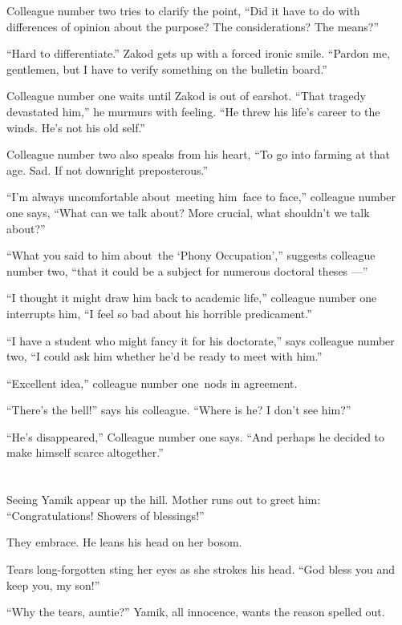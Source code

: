 \documentclass[twoside,11pt]{book}
\begin{document}
Colleague number two tries to clarify the point, ``Did it have to do with differences of opinion about the
purpose? The considerations? The means?''

``Hard to differentiate.'' Zakod gets up with a forced ironic smile. ``Pardon me,
gentlemen, but I have to verify something on the bulletin board.''

Colleague number one waits until Zakod is out of earshot. ``That tragedy devastated him,'' he
murmurs with feeling. ``He threw his life's career to the winds.  He's not his old self.''

Colleague number two also speaks from his heart, ``To go into farming at that age. Sad. If not downright
preposterous.''

{}``I'm always uncomfortable about~meeting him~face to face,'' colleague number one says, ``What can we talk about? More
crucial, what shouldn't we talk about?''

``What you said to him about~the `Phony Occupation',{}'' suggests colleague number two, ``that it could be
a subject for numerous doctoral theses ---''

``I thought it might draw him back to academic life,'' colleague number one interrupts him, ``I feel so bad
about his horrible predicament.''

``I have a student who might fancy it for his doctorate,'' says colleague number two, ``I could ask him
whether he'd be ready to meet with him.''

``Excellent idea,'' colleague number one~nods in agreement.

``There's the bell!'' says his colleague. ``Where is he? I don't see him?''

{}``He's disappeared,'' Colleague number one says. ``And perhaps he decided to make himself
scarce altogether.''


\bigskip

\chapter{}

Seeing Yamik appear up the hill. Mother runs out to greet him: ``Congratulations! Showers of
blessings!''

They embrace. He leans his head on her bosom.

Tears long-forgotten sting her eyes as she strokes his head.  ``God bless you and keep you, my son!''

``Why the tears, auntie?'' Yamik, all innocence, wants the reason spelled out.
\end{document}
